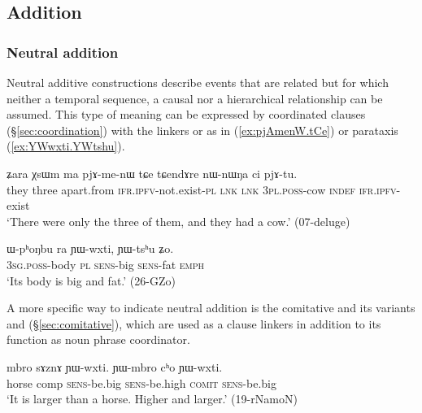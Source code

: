  \subsection{Addition} \label{sec:addition.clauses}
 
\subsubsection{Neutral addition} \label{sec:neutral.addition}
Neutral additive constructions describe events that are related but for which neither a temporal sequence, a causal nor a hierarchical relationship can be assumed. This type of meaning can be expressed by coordinated clauses (§\ref{sec:coordination}) with the linkers  or  as in (\ref{ex:pjAmenW.tCe}) or parataxis (\ref{ex:YWwxti.YWtshu}).


 \begin{exe}
\ex \label{ex:pjAmenW.tCe}
\gll ʑara χsɯm ma pjɤ-me-nɯ tɕe tɕendɤre nɯ-nɯŋa ci pjɤ-tu. \\
they three apart.from \textsc{ifr}.\textsc{ipfv}-not.exist-\textsc{pl} \textsc{lnk} \textsc{lnk} \textsc{3pl}.\textsc{poss}-cow \textsc{indef} \textsc{ifr}.\textsc{ipfv}-exist \\
\glt `There were only the three of them, and they had a cow.' (07-deluge)
\end{exe}
 

\begin{exe}
\ex \label{ex:YWwxti.YWtshu}
\gll ɯ-pʰoŋbu ra ɲɯ-wxti, ɲɯ-tsʰu ʑo.  \\
\textsc{3sg}.\textsc{poss}-body \textsc{pl} \textsc{sens}-big \textsc{sens}-fat \textsc{emph} \\
\glt `Its body is big and fat.' (26-GZo)
\end{exe}
 
 A more specific way to indicate neutral addition is the comitative  and its variants  and  (§\ref{sec:comitative}), which are used as a clause linkers in addition to its function as noun phrase coordinator.
 
\begin{exe}
\ex \label{ex:YWwxti.cho.YWwxti}
\gll  mbro sɤznɤ ɲɯ-wxti. ɲɯ-mbro cʰo ɲɯ-wxti. \\
horse comp \textsc{sens}-be.big  \textsc{sens}-be.high  \textsc{comit} \textsc{sens}-be.big \\
\glt `It is larger than a horse. Higher and larger.'  (19-rNamoN)
\end{exe}
 
